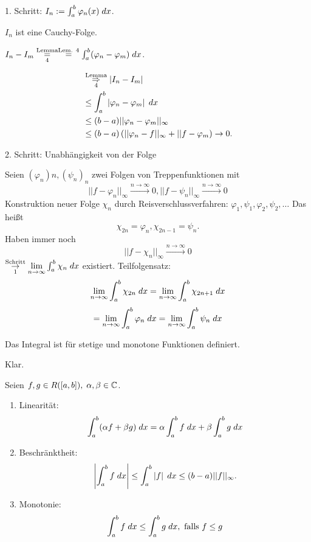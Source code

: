 \documentclass[../ana2.tex]{subfiles}
\begin{document}
\begin{bew}
    1. Schritt: \( I_n := \integral{\varphi_n(x)}{a}{b} \).
    \begin{beh}
        \( I_n \) ist eine Cauchy-Folge.
    \end{beh}
    \begin{bew}
        \( I_n - I_m \overundersett{Lemma}{4}{=} \oversett{Lem. 4}{=} 
        \integral{(\varphi_n - \varphi_m)}{a}{b} \).

        \begin{align*}
            &\overundersett{Lemma}{4}{\Rightarrow} \abs{I_n - I_m} \\
            &\leq \integral{\abs{\varphi_n - \varphi_m}}{a}{b} \\
            &\leq (b-a) ||\varphi_n - \varphi_m||_\infty \\
            &\leq (b-a) \left( ||\varphi_n - f||_\infty 
            + ||f - \varphi_m \right) \rightarrow 0.
        \end{align*}
    \end{bew}
    2. Schritt: Unabhängigkeit von der Folge
    \begin{bew}
        Seien \( (\varphi_n)n, (\psi_n)_n \) zwei Folgen 
        von Treppenfunktionen mit 
        \[ ||f-\varphi_n||_\infty \overset{n\rightarrow \infty}{\rightarrow} 0, 
        ||f-\psi_n||_\infty \overset{n\rightarrow \infty}{\longrightarrow} 0 \]
        Konstruktion neuer Folge \(\chi_n \) durch Reisverschlussverfahren:
        \( \varphi_1, \psi_1, \varphi_2, \psi_2, \ldots \)
        Das heißt
        \[ \chi_{2n} = \varphi_n, \chi_{2n-1} = \psi_n. \]
        Haben immer noch
        \[ ||f - \chi_n||_\infty \overset{n \rightarrow \infty}{\rightarrow} 0 \]
        \( \overundersett{Schritt}{1}{\rightarrow} \limes{n} \integral{\chi_n}{a}{b} \)
        existiert.
        Teilfolgensatz:     
        \[ \limes{n} \integral{\chi_{2n}}{a}{b} = \limes{n} 
        \integral{\chi_{2n+1}}{a}{b} \]
        \[ = \limes{n} \integral{\varphi_n}{a}{b} 
        = \limes{n} \integral{\psi_n}{a}{b} \]
    \end{bew}
\end{bew}
\begin{kor}
    Das Integral ist für stetige und monotone 
    Funktionen definiert.
\end{kor}
\begin{bew}
    Klar.
\end{bew}
\begin{satz}
    Seien \( f,g \in R([a,b]),\; \alpha, \beta \in \C \).
    \begin{enumerate}[label=(\alph*)]
        
        \item Linearität: \[ \integral{(\alpha f + \beta g)}{a}{b}
        = \alpha \integral{f}{a}{b} + \beta \integral{g}{a}{b} \]
        \item Beschränktheit: \[ \abs{\integral{f}{a}{b}} \leq 
        \integral{\abs{f}}{a}{b} 
        \leq (b-a)||f||_\infty. \]
        \item Monotonie: \[ \integral{f}{a}{b} 
        \leq \integral{g}{a}{b}, \text{ falls } f \leq g \]
    \end{enumerate}
\end{satz}
\end{document}
